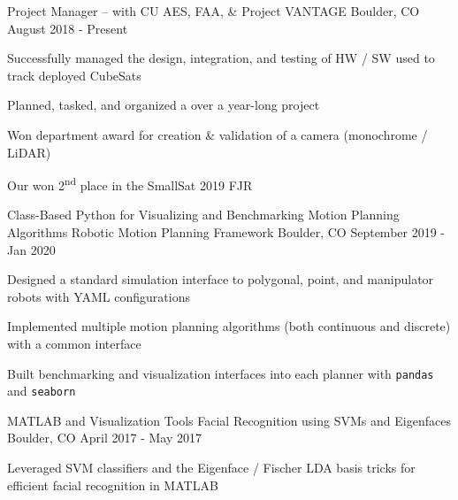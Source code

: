 \begin{cventries}
\cventry
    {Project Manager --  with CU AES, FAA, \& }
    {Project VANTAGE}
    {Boulder, CO}
    {August 2018 - Present}
    {
     \begin{cvitems}
      \item{Successfully managed the design, integration, and testing of HW / SW used to track deployed CubeSats}
      \item{Planned, tasked, and organized a  over a year-long project}
      \item{Won department award for creation \& validation of a camera (monochrome / LiDAR) }
      \item{Our
       won 2\textsuperscript{nd} place in the SmallSat 2019 FJR }
     \end{cvitems}
    }
    
  \cventry
  	{Class-Based Python   for Visualizing and Benchmarking Motion Planning Algorithms }
    {Robotic Motion Planning Framework}
    {Boulder, CO}
    {September 2019 - Jan 2020}
    {
      \begin{cvitems}
        \item{Designed a standard simulation interface to polygonal, point, and manipulator robots with YAML configurations}
        \item{Implemented multiple motion planning algorithms (both continuous and discrete) with a common interface}
        \item {Built benchmarking and visualization interfaces into each planner with \texttt{pandas} and \texttt{seaborn}}
      \end{cvitems}
    }

  \cventry
    {MATLAB  and Visualization Tools}
    {Facial Recognition using SVMs and Eigenfaces}
    {Boulder, CO}
    {April 2017 - May 2017}
    {
      \begin{cvitems}
        \item {Leveraged SVM classifiers and the Eigenface / Fischer LDA basis tricks for efficient facial recognition in MATLAB}
      \end{cvitems}
    }
\end{cventries}
